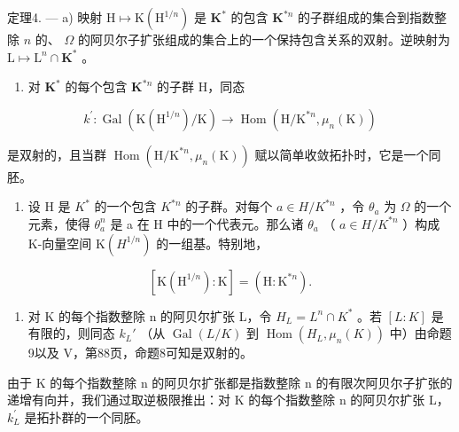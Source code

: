 定理4. --- a) 映射 \(\mathrm{H} \mapsto \mathrm{K}\left(\mathrm{H}^{1/n}\right)\) 是 \(\mathbf{K}^*\) 的包含 \(\mathbf{K}^{*n}\) 的子群组成的集合到指数整除 \(n\) 的、 \(\Omega\) 的阿贝尔子扩张组成的集合上的一个保持包含关系的双射。逆映射为 \(\mathrm{L} \mapsto \mathrm{L}^n \cap \mathbf{K}^*\) 。

\begin{enumerate}
\def\labelenumi{\alph{enumi})}
\setcounter{enumi}{1}
\tightlist
\item
  对 \(\mathbf{K}^*\) 的每个包含 \(\mathbf{K}^{*n}\) 的子群 H，同态
\end{enumerate}

\[
k ^ {\prime}: \operatorname{Gal} \left(\mathrm{K} \left(\mathrm{H} ^ {1 / n}\right) / \mathrm{K}\right)\rightarrow \operatorname{Hom} \left(\mathrm{H} / \mathrm{K} ^ {* n}, \mu_ {n} (\mathrm{K})\right)
\]

是双射的，且当群 \(\operatorname{Hom}(\mathrm{H} / \mathrm{K}^{*n},\mu_n(\mathrm{K}))\) 赋以简单收敛拓扑时，它是一个同胚。

\begin{enumerate}
\def\labelenumi{\alph{enumi})}
\setcounter{enumi}{2}
\tightlist
\item
  设 H 是 \(K^{*}\) 的一个包含 \(K^{*n}\) 的子群。对每个 \(a \in H/K^{*n}\) ，令 \(\theta_{a}\) 为 \(\Omega\) 的一个元素，使得 \(\theta_{a}^{n}\) 是 a 在 H 中的一个代表元。那么诸 \(\theta_{a}\) （ \(a \in H/K^{*n}\) ）构成 K-向量空间 \(\mathrm{K}(H^{1/n})\) 的一组基。特别地，
\end{enumerate}

\[
[ \mathrm{K} (\mathrm{H} ^ {1 / n}): \mathrm{K} ] = (\mathrm{H}: \mathrm{K} ^ {* n}).
\]

\begin{enumerate}
\def\labelenumi{\Alph{enumi})}
\tightlist
\item
  对 K 的每个指数整除 n 的阿贝尔扩张 L，令 \(H_{L} = L^{n} \cap K^{*}\) 。若 \([L : K]\) 是有限的，则同态 \(k_{L}'\) （从 \(\operatorname{Gal}(L/K)\) 到 \(\operatorname{Hom}(H_{L}, \mu_{n}(K))\) 中）由命题9以及 V，第88页，命题8可知是双射的。
\end{enumerate}

由于 K 的每个指数整除 n 的阿贝尔扩张都是指数整除 n 的有限次阿贝尔子扩张的递增有向并，我们通过取逆极限推出：对 K 的每个指数整除 n 的阿贝尔扩张 L， \(k_{L}^{\prime}\) 是拓扑群的一个同胚。

